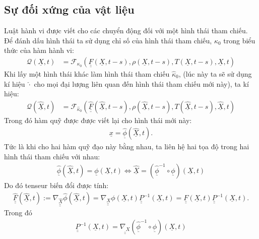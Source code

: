 \documentclass[../../../main.tex]{subfiles}
\begin{document}
\subsection{Sự đối xứng của vật liệu}
	Luật hành vi được viết cho các chuyển động đối với một hình thái tham chiếu. Để đánh dấu hình thái ta sử dụng chỉ số của hình thái tham chiếu, $\kappa_0$ trong biểu thức của hàm hành vi:
		\begin{align}
			\mathcal{Q}\left(\underline{X},t\right)&=\mathcal{F}_{\kappa_0}\left(\underline{\underline{F}}\left(\underline{X},t-s\right),\rho\left(\underline{X},t-s\right),T\left(\underline{X},t-s\right),\underline{X},t\right)
		\end{align}
	Khi lấy một hình thái khác làm hình thái tham chiếu $\widehat{\kappa}_0$, (lúc này ta sẽ sử dụng kí hiệu $\widehat{\cdot}$ cho mọi đại lượng liên quan đến hình thái tham chiếu mới này), ta kí hiệu:
	\begin{align}
		\mathcal{Q}\left(\underline{\widehat{X}},t\right)&=\mathcal{F}_{\widehat{\kappa}_0}\left(\underline{\underline{\widehat{F}}}\left(\underline{\widehat{X}},t-s\right),\rho\left(\underline{\widehat{X}},t-s\right),T\left(\underline{\widehat{X}},t-s\right),\underline{\widehat{X}},t\right)
	\end{align}
	Trong đó hàm quỹ được được viết lại cho hình thái mới này:
		\begin{align}
			\underline{x}=\underline{\widehat{\phi}}\left(\underline{\widehat{X}},t\right).
		\end{align}
	Tức là khi cho hai hàm quỹ đạo này bằng nhau, ta liên hệ hai tọa độ trong hai hình thái tham chiếu với nhau:
		\[
			\begin{aligned}
				\underline{\widehat{\phi}}\left(\underline{\widehat{X}},t\right)=\underline{\phi}\left(\underline{X},t\right)\Longleftrightarrow\underline{\widehat{X}}=\left(\underline{\widehat{\phi}}^{-1}\circ\underline{\phi}\right)\left(\underline{X},t\right)
			\end{aligned}
		\]
	Do đó tenseur biến đổi được tính:
		\begin{align}
			\underline{\underline{\widehat{F}}}\left(\underline{\widehat{X}},t\right):=\underline{\underline{\nabla_{\widehat{X}}\widehat{\phi}}}\left(\underline{\widehat{X}},t\right)=\underline{\underline{\nabla_X\phi}}\left(\underline{X},t\right)\underline{\underline{P}}^{-1}\left(\underline{X},t\right)=\underline{\underline{F}}\left(\underline{X},t\right)\underline{\underline{P}}^{-1}\left(\underline{X},t\right).
		\end{align}
	Trong đó
		\begin{align}
			\underline{\underline{P}}^{-1}\left(\underline{X},t\right)=\underline{\underline{\nabla_X}}\left(\underline{\widehat{\phi}}^{-1}\circ\underline{\phi}\right)\left(\underline{X},t\right)
		\end{align}
\end{document}
